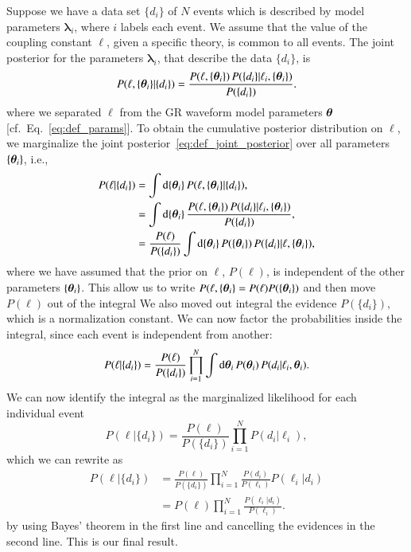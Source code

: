 Suppose we have a data set $\{d_{i}\}$ of $N$ events which is described by
model parameters $\bm{\lambda}_{i}$, where $i$ labels each event.
%
We assume that the value of the coupling constant $\ell$, given a specific theory,
is common to all events.
%
%
The joint posterior for the parameters $\bm{\lambda}_{i}$, that describe the
data $\{d_{i}\}$, is
%
\begin{equation}
P(\ell, \{\bm{\theta}_i\} | \{d_{i}\})
= \frac{ P(\ell, \{\bm{\theta}_i\}) \, P( \{d_i\} | \ell_i, \{\bm{\theta}_i\} ) }{ P(\{d_i\}) }.
\label{eq:def_joint_posterior}
\end{equation}
%
where we separated $\ell$ from the GR waveform model parameters $\bm{\theta}$ [cf.~Eq.~\eqref{eq:def_params}].
%
%
To obtain the cumulative posterior distribution on $\ell$, we marginalize
the joint posterior~\eqref{eq:def_joint_posterior} over
all parameters $\{ \bm{\theta}_i \}$, i.e.,
%
\begin{align}
P(\ell | \{d_i\}) &= \int {\rm d} \{\bm{\theta}_i\} \, P(\ell, \{\bm{\theta}_i\} | \{d_{i}\}),
\nonumber \\
                  &= \int {\rm d} \{\bm{\theta}_i\} \, \frac{ P(\ell, \{\bm{\theta}_i\}) \, P( \{d_i\} | \ell_i, \{\bm{\theta}_i\} ) }{ P(\{d_i\}) },
\nonumber \\
                  &= \frac{P(\ell)}{P(\{d_i\})} \int {\rm d} \{\bm{\theta}_i\} \, P(\{\bm{\theta}_i\}) \, P( \{d_i\} | \ell, \{\bm{\theta}_i\} ),
\end{align}
%
where we have assumed that the prior on $\ell$, $P(\ell)$, is independent of
the other parameters $\{\bm{\theta}_i\}$.
%
This allow us to write $P(\ell, \{\bm{\theta}_i\} = P(\ell) P(\{\bm{\theta}_i\})$
and then move $P(\ell)$ out of the integral
%
We also moved out integral the evidence $P(\{d_i\})$, which is a normalization constant.
%
%
We can now factor the probabilities inside the integral, since each event is independent from another:
%
\begin{equation}
P(\ell | \{d_i\}) = \frac{P(\ell)}{P(\{d_i\})}
\prod_{i=1}^{N}
\int {\rm d} \bm{\theta}_i \, P(\bm{\theta}_i) \, P( d_i | \ell_i, \bm{\theta}_i ).
\end{equation}
%
We can now identify the integral as the marginalized likelihood for each individual event
%
\begin{equation}
P(\ell | \{d_i\}) = \frac{P(\ell)}{P(\{d_i\})}
\prod_{i=1}^{N} P( d_i | \ell_i ),
\end{equation}
%
which we can rewrite as
%
\begin{align}
P(\ell | \{d_i\}) &= \frac{P(\ell)}{P(\{d_i\})}
\prod_{i=1}^{N} \frac{P(d_i)}{P(\ell_i)} P(\ell_i | d_i)
\nonumber \\
&= P(\ell)
\prod_{i=1}^{N} \frac{P(\ell_i | d_i)}{P(\ell_i)}.
\label{eq:cumulative_dist_ell}
\end{align}
%
by using Bayes' theorem in the first line and cancelling the evidences in the
second line. This is our final result.

